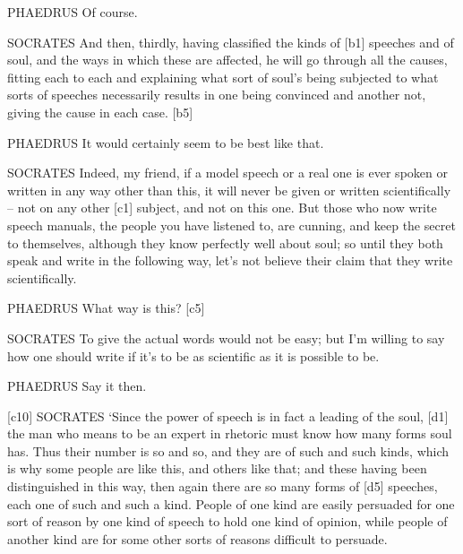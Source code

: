 PHAEDRUS Of course.

SOCRATES And then, thirdly, having classified the
kinds of {[}b1{]}
speeches and of soul, and the ways in which these are affected, he will
go through all the causes, fitting each to each and explaining what sort
of soul's being subjected to what sorts of speeches necessarily results
in one being convinced and another not, giving the cause in each case.
{[}b5{]}

PHAEDRUS It would certainly seem to be best like that.

SOCRATES Indeed, my friend, if a model
speech or a real one is
ever spoken or written in any way other than this, it will never be
given or written scientifically -- not on any other {[}c1{]} subject,
and not on this one. But
those who now write speech manuals, the people you have listened to, are
cunning, and keep the secret to themselves, although they know perfectly
well about soul; so until they both speak and write in the following
way, let's not believe their claim that they write scientifically.

PHAEDRUS What way is this? {[}c5{]}

SOCRATES To give the actual words would not be easy; but I'm willing to
say how one should write
if it's to be as scientific as it is possible to be.

PHAEDRUS Say it then.

{[}c10{]} SOCRATES ‘Since the power of speech is in fact a leading of
the soul, {[}d1{]} the man who means to be an expert in rhetoric must
know how many forms soul has. Thus their number is so and so, and they
are of such and such kinds, which is why some people are like this, and
others like that; and these having been distinguished in this way, then
again there are so many forms of {[}d5{]} speeches, each one of such and
such a kind. People of one kind are easily persuaded for one sort of
reason by one kind of speech to hold one kind of opinion, while people
of another kind are for some other sorts of reasons difficult to
persuade.

